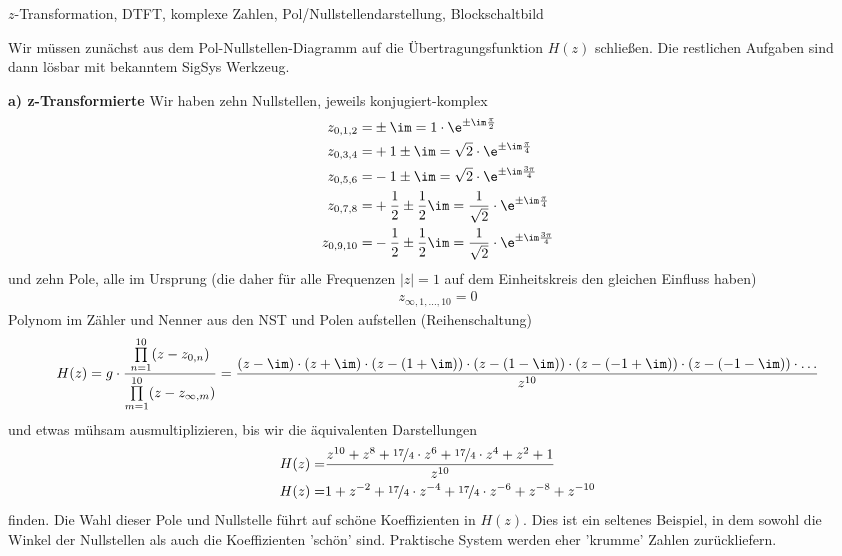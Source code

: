 \begin{Werkzeug}
$z$-Transformation, DTFT, komplexe Zahlen, Pol/Nullstellendarstellung, Blockschaltbild
\end{Werkzeug}
\begin{Ansatz}
Wir müssen zunächst aus dem
Pol-Nullstellen-Diagramm auf die Übertragungsfunktion $H(z)$ schließen. Die
restlichen Aufgaben sind dann lösbar mit bekanntem SigSys Werkzeug.
\end{Ansatz}
%
\begin{ExCalc}
%
\textbf{a) z-Transformierte}
%
Wir haben zehn Nullstellen, jeweils konjugiert-komplex
\begin{align}
z_{0,1,2} =& \pm \im = 1 \cdot \e^{\pm \im \frac{\pi}{2}}\\
z_{0,3,4} =& +1 \pm \im =  \sqrt{2} \cdot \e^{\pm \im \frac{\pi}{4}}\\
z_{0,5,6} =& -1 \pm \im = \sqrt{2} \cdot \e^{\pm \im \frac{3\pi}{4}}\\
z_{0,7,8} =& +\frac{1}{2} \pm \frac{1}{2}\im = \frac{1}{\sqrt{2}} \cdot \e^{\pm \im \frac{\pi}{4}}\\
z_{0,9,10} =& -\frac{1}{2} \pm \frac{1}{2}\im = \frac{1}{\sqrt{2}} \cdot \e^{\pm \im \frac{3\pi}{4}}
\end{align}
und zehn Pole, alle im Ursprung (die daher für alle Frequenzen $|z|=1$ auf dem
Einheitskreis den gleichen Einfluss haben)
\begin{align}
z_{\infty,1,...,10} = 0
\end{align}
Polynom im Zähler und Nenner aus den NST und Polen aufstellen (Reihenschaltung)
\begin{align}
H(z) = g\cdot
\frac
{\prod\limits_{n=1}^{10} (z-z_{0,n})}
{\prod\limits_{m=1}^{10} (z-z_{\infty,m})} =
\frac{
(z-\im)\cdot
(z+\im)\cdot
(z-(1 + \im))\cdot
(z-(1 - \im))\cdot
(z-(-1 + \im))\cdot
(z-(-1 - \im))\cdot
\dots
}{z^{10}}
\end{align}
und etwas mühsam ausmultiplizieren, bis wir die äquivalenten Darstellungen
\begin{align}
H(z) =& \frac{z^{10} + z^8    + \nicefrac{17}{4}\cdot z^6     + \nicefrac{17}{4}\cdot z^4    + z^2    + 1}{z^{10}}\\
H(z) =& 1            + z^{-2} + \nicefrac{17}{4}\cdot z^{-4}  + \nicefrac{17}{4}\cdot z^{-6} + z^{-8} + z^{-10}
\end{align}
finden.
%
Die Wahl dieser Pole und Nullstelle führt auf schöne Koeffizienten in
$H(z)$. Dies ist ein seltenes Beispiel, in dem sowohl die Winkel der Nullstellen
als auch die Koeffizienten 'schön' sind.
%
Praktische System werden eher 'krumme' Zahlen zurückliefern.
%


\end{ExCalc}
